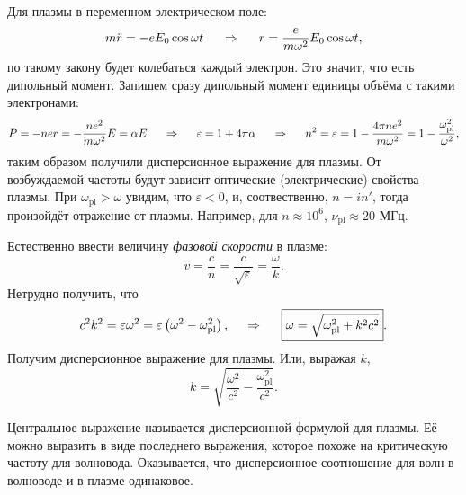 Для плазмы в переменном электрическом поле:
\begin{equation}
    m \ddot{r} = - e E_0 \cos \omega t 
    \hspace{0.5cm} \Rightarrow \hspace{0.5cm} 
    r = \frac{e}{m \omega^2} E_0 \cos \omega t,
\end{equation}
по такому закону будет колебаться каждый электрон. Это значит, что есть дипольный момент. Запишем сразу дипольный момент единицы объёма с такими электронами:
\begin{equation}
    P = - n e r = - \frac{n e^2}{m \omega^2} E = \alpha E 
    \hspace{0.5cm} \Rightarrow \hspace{0.5cm} 
    \varepsilon = 1+ 4 \pi \alpha
    \hspace{0.5cm} \Rightarrow \hspace{0.5cm} 
    n^2 =  \varepsilon = 
    1 - \frac{4\pi n e^2}{m \omega^2} 
    =
    1 -  \frac{\omega_\text{pl}^2}{\omega^2},
\end{equation}
таким образом получили дисперсионное выражение для плазмы. От возбуждаемой частоты будут зависит оптические (электрические) свойства плазмы. При $\omega_{\text{pl}} > \omega$ увидим, что $\varepsilon < 0$, и, соотвественно, $n = i n'$, тогда произойдёт отражение от плазмы. Например, для $n \approx 10^6$, $\nu_{\text{pl}} \approx 20$ МГц.

Естественно ввести величину \textit{фазовой скорости} в плазме:
\begin{equation}
    v = \frac{c}{n} = \frac{c}{\sqrt{\varepsilon}}= \frac{\omega}{k}.
\end{equation}
Нетрудно получить, что
\begin{equation*}
c^2 k^2 = \varepsilon \omega^2 = \varepsilon \left(\omega^2 - \omega_\text{pl}^2\right), \hspace{0.5cm} \Rightarrow \hspace{0.5cm} 
     \boxed{\omega = \sqrt{\omega_\text{pl}^2 + k^2 c^2}}.
\end{equation*}
Получим дисперсионное выражение для плазмы. Или, выражая $k$,
\begin{equation*}
    k = \sqrt{\frac{\omega^2}{c^2} - \frac{\omega^2_\text{pl}}{c^2 }}.
\end{equation*}


Центральное выражение называется дисперсионной формулой для плазмы. Её можно выразить в виде последнего выражения, которое похоже на критическую частоту для волновода. Оказывается, что дисперсионное соотношение для волн в волноводе и в плазме одинаковое.